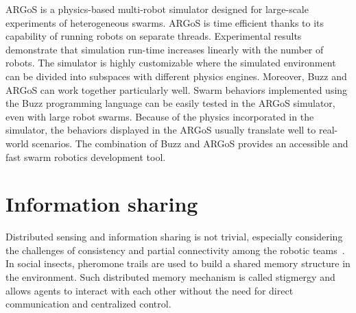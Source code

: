 ARGoS \cite{Pinciroli:SI2012} is a physics-based multi-robot simulator designed for large-scale experiments of heterogeneous swarms. ARGoS is time efficient thanks to its capability of running robots on separate threads. Experimental results demonstrate that simulation run-time increases linearly with the number of robots. The simulator is highly customizable where the simulated environment can be divided into subspaces with different physics engines. Moreover, Buzz and ARGoS can work together particularly well. Swarm behaviors implemented using the Buzz programming language can be easily tested in the ARGoS simulator, even with large robot swarms. Because of the physics incorporated in the simulator, the behaviors displayed in the ARGoS usually translate well to real-world scenarios. The combination of Buzz and ARGoS provides an accessible and fast swarm robotics development tool. 


\section{Information sharing}
Distributed sensing and information sharing is not trivial, especially considering the challenges of consistency and partial connectivity among the
robotic teams~\cite{amigoni2017multirobot,otte2018emergent}. In social insects, pheromone trails are used to build a shared memory structure in the environment. Such distributed memory mechanism is called stigmergy \cite{heylighen2016stigmergy1, heylighen2016stigmergy2} and allows agents to interact with each other without the need for direct communication and centralized control.

